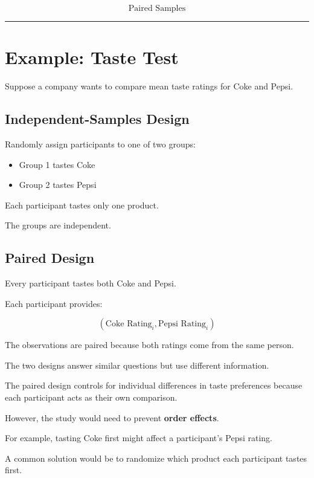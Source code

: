 \documentclass[
  letterpaper,
  DIV=11,
  numbers=noendperiod]{scrreprt}
\providecommand{\tightlist}{%
  \setlength{\itemsep}{0pt}\setlength{\parskip}{0pt}}
\begin{document}
\[
\boxed{\text{Paired Samples}}
\]

\begin{center}\rule{0.5\linewidth}{0.5pt}\end{center}

\section{Example: Taste Test}\label{example-taste-test}

Suppose a company wants to compare mean taste ratings for Coke and
Pepsi.

\subsection{Independent-Samples
Design}\label{independent-samples-design}

Randomly assign participants to one of two groups:

\begin{itemize}
\tightlist
\item
  Group 1 tastes Coke
\item
  Group 2 tastes Pepsi
\end{itemize}

Each participant tastes only one product.

The groups are independent.

\subsection{Paired Design}\label{paired-design}

Every participant tastes both Coke and Pepsi.

Each participant provides:

\[
(\text{Coke Rating}_i,\text{Pepsi Rating}_i)
\]

The observations are paired because both ratings come from the same
person.

The two designs answer similar questions but use different information.

The paired design controls for individual differences in taste
preferences because each participant acts as their own comparison.

However, the study would need to prevent \textbf{order effects}.

For example, tasting Coke first might affect a participant's Pepsi
rating.

A common solution would be to randomize which product each participant
tastes first.
\end{document}
